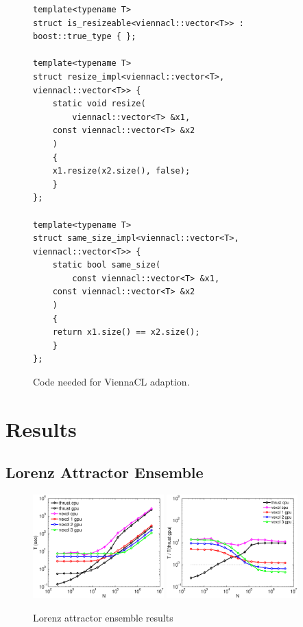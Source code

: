 \documentclass[1p]{elsarticle}
\begin{document}
\begin{figure}
\begin{lstlisting}
template<typename T>
struct is_resizeable<viennacl::vector<T>> : boost::true_type { };

template<typename T>
struct resize_impl<viennacl::vector<T>, viennacl::vector<T>> {
    static void resize(
        viennacl::vector<T> &x1,
	const viennacl::vector<T> &x2
	)
    {
	x1.resize(x2.size(), false);
    }
};

template<typename T>
struct same_size_impl<viennacl::vector<T>, viennacl::vector<T>> {
    static bool same_size(
        const viennacl::vector<T> &x1,
	const viennacl::vector<T> &x2
	)
    {
	return x1.size() == x2.size();
    }
};
\end{lstlisting}
\caption{Code needed for ViennaCL adaption.}
\label{fig:adapt:viennacl}
\end{figure}


\section{Results}

\subsection{Lorenz Attractor Ensemble}

\begin{figure}
    \begin{center}
	\includegraphics[width=0.45\textwidth]{data/lorenz_ensemble/abs}
	\includegraphics[width=0.45\textwidth]{data/lorenz_ensemble/rel}
    \end{center}
    \caption{Lorenz attractor ensemble results}
    \label{fig:lorenz:perf}
\end{figure}
\end{document}
